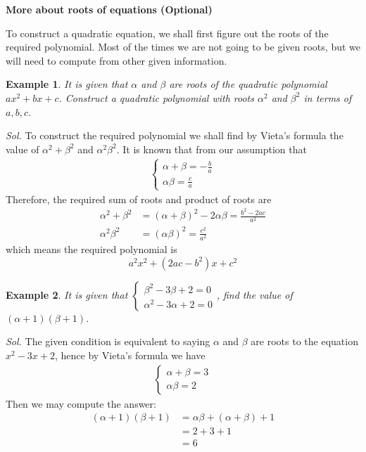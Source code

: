 \documentclass[12pt]{article}
\newtheorem{example}{Example}
\begin{document}
    \begin{center}
        \textbf{More about roots of equations (Optional)}
    \end{center}

    To construct a quadratic equation, we shall first figure out the roots of the required polynomial. Most of the times we are not going to be given roots, but we will need to compute from other given information.

    \begin{example}
        It is given that $\alpha$ and $\beta$ are roots of the quadratic polynomial $ax^2+bx+c$. Construct a quadratic polynomial with roots $\alpha^2$ and $\beta^2$ in terms of $a,b,c$.
    \end{example}

    \textit{ Sol.} To construct the required polynomial we shall find by Vieta's formula the value of $\alpha^2+\beta^2$ and $\alpha^2\beta^2$. It is known that from our assumption that \begin{align*}
        \begin{cases}
            \alpha+\beta=-\frac{b}{a}\\
            \alpha\beta=\frac{c}{a}
        \end{cases}
    \end{align*}
    Therefore, the required sum of roots and product of roots are \begin{align*}
        \alpha^2+\beta^2&=(\alpha+\beta)^2-2\alpha\beta=\frac{b^2-2ac}{a^2}\\
        \alpha^2\beta^2&=(\alpha\beta)^2=\frac{c^2}{a^2}
    \end{align*}
    which means the required polynomial is $$a^2x^2+(2ac-b^2)x+c^2$$

    \begin{example}
        It is given that $\begin{cases}
                \beta^2-3\beta+2=0\\
                \alpha^2-3\alpha+2=0
            \end{cases}$, find the value of $(\alpha+1)(\beta+1)$.
    \end{example}

    \textit{ Sol.} The given condition is equivalent to saying $\alpha$ and $\beta$ are roots to the equation $x^2-3x+2$, hence by Vieta's formula we have \begin{align*}
        \begin{cases}
            \alpha+\beta=3\\
            \alpha\beta=2
        \end{cases}
    \end{align*}
    Then we may compute the answer:\begin{align*}
        (\alpha+1)(\beta+1)&=\alpha\beta+(\alpha+\beta)+1\\
        &=2+3+1\\
        &=6
    \end{align*}
\end{document}

